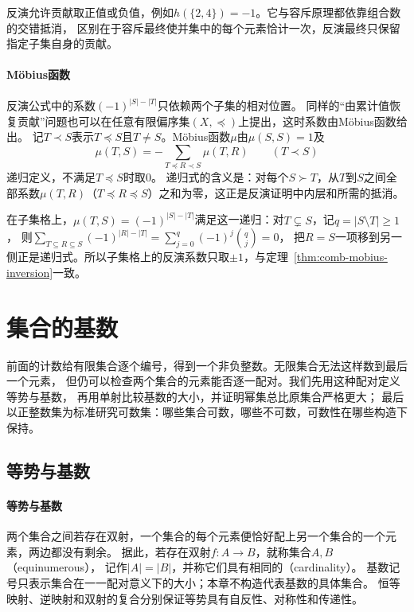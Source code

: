 反演允许贡献取正值或负值，例如$h(\{2,4\})=-1$。它与容斥原理都依靠组合数的交错抵消，
区别在于容斥最终使并集中的每个元素恰计一次，反演最终只保留指定子集自身的贡献。

\paragraph{Möbius函数}

反演公式中的系数$(-1)^{|S|-|T|}$只依赖两个子集的相对位置。
同样的“由累计值恢复贡献”问题也可以在任意有限偏序集$(X,\preceq)$上提出，这时系数由Möbius函数给出。
记$T\prec S$表示$T\preceq S$且$T\neq S$。Möbius函数$\mu$由$\mu(S,S)=1$及
\[
 \mu(T,S)=-\sum_{T\preceq R\prec S}\mu(T,R)\qquad(T\prec S)
\]
递归定义，不满足$T\preceq S$时取$0$。
递归式的含义是：对每个$S\succ T$，从$T$到$S$之间全部系数$\mu(T,R)$（$T\preceq R\preceq S$）之和为零，这正是反演证明中内层和所需的抵消。

在子集格上，$\mu(T,S)=(-1)^{|S|-|T|}$满足这一递归：对$T\subsetneq S$，记$q=|S\setminus T|\geq1$，
则$\sum_{T\subseteq R\subseteq S}(-1)^{|R|-|T|}=\sum_{j=0}^q(-1)^j\binom qj=0$，
把$R=S$一项移到另一侧正是递归式。所以子集格上的反演系数只取$\pm1$，与定理~\ref{thm:comb-mobius-inversion}一致。

\FloatBarrier
\section{集合的基数}
\label{sec:comb-cardinality}

前面的计数给有限集合逐个编号，得到一个非负整数。无限集合无法这样数到最后一个元素，
但仍可以检查两个集合的元素能否逐一配对。我们先用这种配对定义等势与基数，
再用单射比较基数的大小，并证明幂集总比原集合严格更大；
最后以正整数集为标准研究可数集：哪些集合可数，哪些不可数，可数性在哪些构造下保持。

\subsection{等势与基数}
\label{sec:comb-equinumerosity-cardinality}

\paragraph{等势与基数}
两个集合之间若存在双射，一个集合的每个元素便恰好配上另一个集合的一个元素，两边都没有剩余。
据此，若存在双射$f:A\to B$，就称集合$A,B$（equinumerous），
记作$|A|=|B|$，并称它们具有相同的（cardinality）。
基数记号只表示集合在一一配对意义下的大小；本章不构造代表基数的具体集合。
恒等映射、逆映射和双射的复合分别保证等势具有自反性、对称性和传递性。

